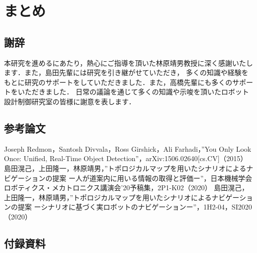 \documentclass[../main]{subfiles}
\begin{document}
\setcounter{secnumdepth}{2}
    \chapter{まとめ}
        \section*{謝辞}
        本研究を進めるにあたり，熱心にご指導を頂いた林原靖男教授に深く感謝いたします．また，島田先輩には研究を引き継がせていただき，
        多くの知識や経験をもとに研究のサポートをしていただきました．また，高橋先輩にも多くのサポートをいただきました．
        日常の議論を通じて多くの知識や示唆を頂いたロボット設計制御研究室の皆様に謝意を表します．
        \section*{参考論文}
        \begin{thebibliography}{2}
             Joseph Redmon，Santosh Divvala，Ross Girshick，Ali Farhadi，”You Only Look Once: Unified, Real-Time Object Detection”，arXiv:1506.02640[cs.CV]（2015）
             島田滉己，上田隆一，林原靖男，”トポロジカルマップを用いたシナリオによるナビゲーションの提案 ー人が道案内に用いる情報の取得と評価ー”，日本機械学会ロボティクス・メカトロニクス講演会'20予稿集，2P1-K02（2020）
             島田滉己，上田隆一，林原靖男，”トポロジカルマップを用いたシナリオによるナビゲーションの提案 ーシナリオに基づく実ロボットのナビゲーションー”，1H2-04，SI2020（2020）
        \end{thebibliography}
        \section*{付録資料}
\end{document}
